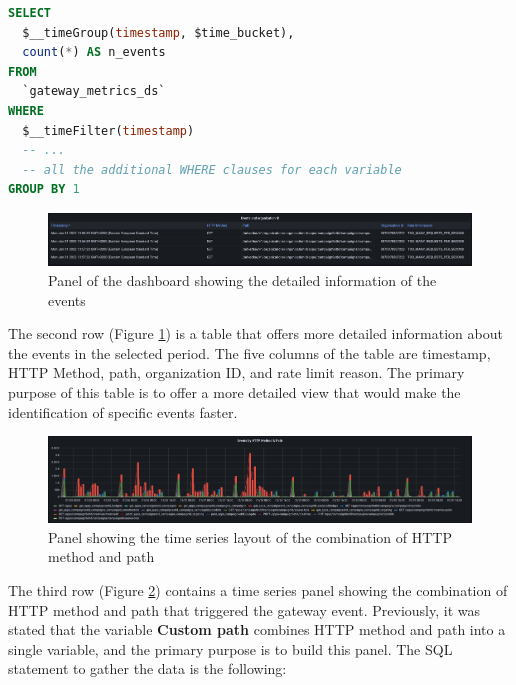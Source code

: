 \documentclass[english, 12pt, a4paper, sci, utf8, a-1b, online]{aaltothesis}
\begin{document}
\begin{lstlisting}[language=sql,firstnumber=1]
SELECT 
  $__timeGroup(timestamp, $time_bucket),
  count(*) AS n_events
FROM 
  `gateway_metrics_ds`
WHERE 
  $__timeFilter(timestamp)
  -- ...
  -- all the additional WHERE clauses for each variable
GROUP BY 1
\end{lstlisting}

\begin{figure}[h]
    \centering
    \includegraphics[scale=0.24]{src/thesis/img/technical-solution/grafana-dashboard/row-2.png}
    \caption{Panel of the dashboard showing the detailed information of the events}
    \label{fig:grafana-row-2}
\end{figure}

The second row (Figure \ref{fig:grafana-row-2}) is a table that offers more detailed information about the events in the selected period. The five columns of the table are timestamp, HTTP Method, path, organization ID, and rate limit reason. The primary purpose of this table is to offer a more detailed view that would make the identification of specific events faster.

\begin{figure}[h]
    \centering
    \includegraphics[scale=0.24]{src/thesis/img/technical-solution/grafana-dashboard/row-3.png}
    \caption{Panel showing the time series layout of the combination of HTTP method and path}
    \label{fig:grafana-row-3}
\end{figure}

The third row (Figure \ref{fig:grafana-row-3}) contains a time series panel showing the combination of HTTP method and path that triggered the gateway event. Previously, it was stated that the variable \textbf{Custom path} combines HTTP method and path into a single variable, and the primary purpose is to build this panel. The SQL statement to gather the data is the following:
\end{document}
